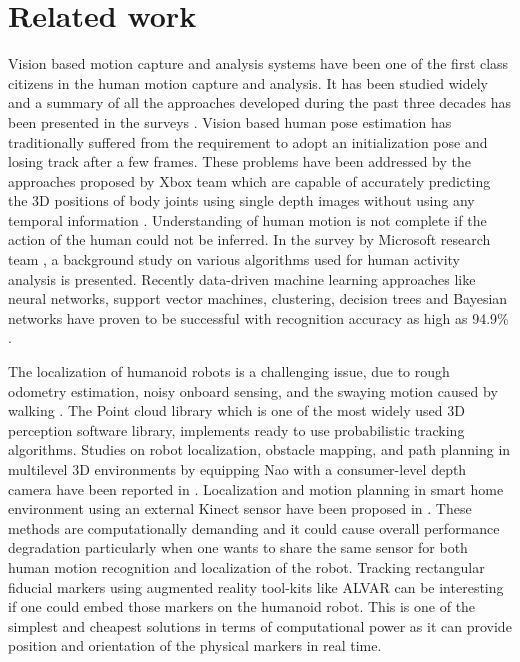 \documentclass{llncs}
\begin{document}
\section{Related work}
	Vision based motion capture and analysis systems have been one of the first class citizens in the human motion capture and analysis. It has been studied widely and a summary of all the approaches developed during the past three decades has been presented in the surveys \cite{Moeslund200690}\cite{Poppe20074}. Vision based human pose estimation has traditionally suffered from the requirement to adopt an initialization pose and losing track after a few frames. These problems have been addressed by the approaches proposed by Xbox \cite{Kinect2014} team which are capable of accurately predicting the 3D positions of body joints using single depth images without using any temporal information \cite{Shotton2013}. Understanding of human motion is not complete if the action of the human could not be inferred. In the survey by Microsoft research team \cite{KinectCV2013}, a background study on various algorithms used for human activity analysis is presented. Recently data-driven machine learning approaches like neural networks, support vector machines, clustering, decision trees and Bayesian networks have proven to be successful with recognition accuracy as high as 94.9\% \cite{Kinect2014}.
	
	The localization of humanoid robots is a challenging issue, due to rough odometry estimation, noisy onboard sensing, and the swaying motion caused by walking \cite{Cervera2012}. The Point cloud library \cite{RusuPCL11} which is one of the most widely used 3D perception software library, implements ready to use probabilistic tracking algorithms. Studies on robot localization, obstacle mapping, and path planning in multilevel 3D environments by equipping Nao with a consumer-level depth camera have been reported in \cite{Maier2012}. Localization and motion planning in smart home environment using an external Kinect sensor have been proposed in \cite{Cervera2012}. These methods are computationally demanding and it could cause overall performance degradation particularly when one wants to share the same sensor for both human motion recognition and localization of the robot. Tracking rectangular fiducial markers using  augmented reality tool-kits like ALVAR \cite{ALVAR} can be interesting if one could embed those markers on the humanoid robot. This is one of the simplest and cheapest solutions in terms of computational power as it can provide position and orientation of the physical markers in real time.
	
\end{document}
